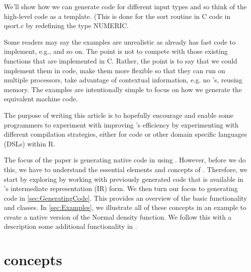 \documentclass[article]{jss}
\begin{document}
We'll show how we can generate code for different input types
and so think of the high-level code as a template.
(This is done for the sort routine in C code in qsort.c by redefining the
type NUMERIC.


Some readers may say the examples are unrealistic as \R{} already has
fast code to implement, e.g.,  and so on.  The point is not
to compete with those existing functions that are implemented in
C. Rather, the point is to say that we could implement them in \R{}
code, make them more flexible so that they can run on multiple
processors, take advantage of contextual information, e.g. no \na's,
reusing memory. The examples are intentionally simple to focus on how
we generate the equivalent machine code.


The purpose of writing this article is to hopefully encourage and
enable some \R{} programmers to experiment with improving \R's
efficiency by experimenting with different compilation strategies,
either for \R{} code or other domain specific languages (DSLs) within
R.


\begin{comment}
We'll use examples from the ``Writing R extensions manual'' also used
in the \Rpkg{Rcpp}~\cite{bib:Rcpp} package to facilitate comparison.
\end{comment}


The focus of the paper is generating native code in \R{} using \llvm.
However, before we do this, we have to understand the essential
elements and concepts of \llvm.  Therefore, we start by exploring
\llvm{} by working with previously generated code that is available in
\llvm's intermediate representation (IR) form.  We then turn our focus
to generating code in \ref{sec:GeneratingCode}.  This provides an
overview of the basic functionality and classes.  In
\ref{sec:Examples}, we illustrate all of these concepts in an example
to create a native version of the Normal density function.
We follow this with a description some additional functionality
in .





\section[LLVM Concepts]{\llvm concepts}
\end{document}
